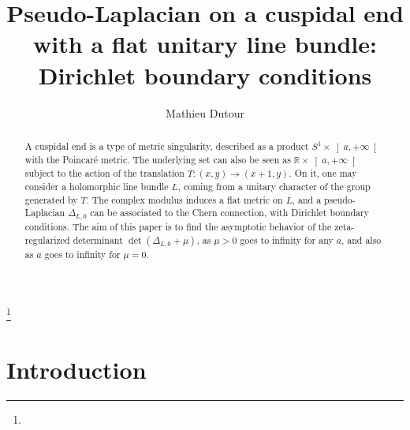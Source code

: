\documentclass{jams-l}
\theoremstyle{definition}
\theoremstyle{remark}
\numberwithin{equation}{section}
\begin{document}
\title[Pseudo-Laplacian on a cuspidal end: Dirichlet conditions]{Pseudo-Laplacian on a cuspidal end with a flat unitary line bundle: Dirichlet boundary conditions}


\author{Mathieu Dutour}
\address{University of Alberta, Department of Mathematical and Statistical Sciences, Central Academic Building, Edmonton, Alberta, Canada T6G2G1}
\curraddr{}
\thanks{}



\date{}

\dedicatory{}

\begin{abstract}

    A cuspidal end is a type of metric singularity, described as a product $S^1 \times \left] a, +\infty \right[$ with the Poincaré metric. The underlying set can also be seen as $\mathbb{R} \times \left] a, +\infty \right[$ subject to the action of the translation $T : \left( x,y \right) \longrightarrow \left( x+1, y \right)$. On it, one may consider a holomorphic line bundle $L$, coming from a unitary character of the group generated by $T$. The complex modulus induces a flat metric on $L$, and a pseudo-Laplacian $\Delta_{L,0}$ can be associated to the Chern connection, with Dirichlet boundary conditions. The aim of this paper is to find the asymptotic behavior of the zeta-regularized determinant $\det \left( \Delta_{L,0} + \mu \right)$, as $\mu > 0$ goes to infinity for any $a$, and also as $a$ goes to infinity for $\mu = 0$. \vspace{10pt}

\end{abstract}

\maketitle

\tableofcontents


\section{Introduction}
\end{document}
